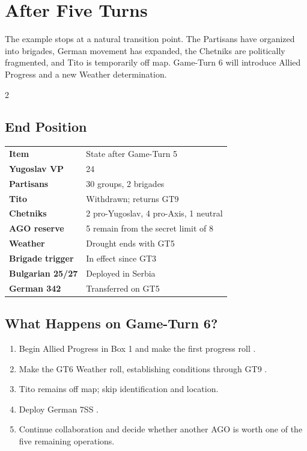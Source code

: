 \playbookbreak
\section{After Five Turns}

\begin{lessonbox}
The example stops at a natural transition point. The Partisans have organized
into brigades, German movement has expanded, the Chetniks are politically
fragmented, and Tito is temporarily off map. Game-Turn 6 will introduce Allied
Progress and a new Weather determination.
\end{lessonbox}

\begin{multicols}{2}
\small
\subsection{End Position}

\begin{tabularx}{\linewidth}{@{}>{\bfseries}l X@{}}
  \rowcolor{TitoInk!15}
  Item & State after Game-Turn 5 \\
  Yugoslav VP & 24 \\
  Partisans & 30 groups, 2 brigades \\
  Tito & Withdrawn; returns GT9 \\
  Chetniks & 2 pro-Yugoslav, 4 pro-Axis, 1 neutral \\
  AGO reserve & 5 remain from the secret limit of 8 \\
  Weather & Drought ends with GT5 \\
  Brigade trigger & In effect since GT3 \\
  Bulgarian 25/27 & Deployed in Serbia \\
  German 342 & Transferred on GT5 \\
\end{tabularx}

\subsection{What Happens on Game-Turn 6?}

\begin{enumerate}[leftmargin=1.4em,itemsep=2pt]
  \item Begin Allied Progress in Box 1 and make the first progress roll
    .
  \item Make the GT6 Weather roll, establishing conditions through GT9
    .
  \item Tito remains off map; skip identification and location.
  \item Deploy German 7SS .
  \item Continue collaboration and decide whether another AGO is worth one of
    the five remaining operations.
\end{enumerate}


\end{multicols}
